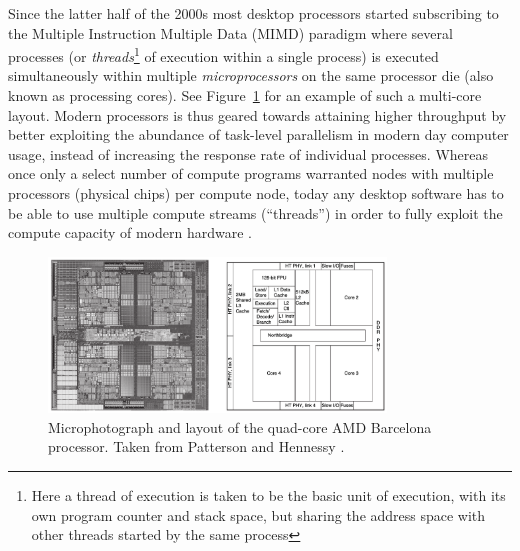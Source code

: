 Since the latter half of the 2000s most desktop processors started subscribing to the Multiple Instruction Multiple Data (MIMD) paradigm where several processes 
(or \textit{threads}\footnote{Here a thread of execution is taken to be the basic unit of execution, with its own program counter and stack space, but sharing the address space with other threads started by the same process} of execution 
within a single process) is executed simultaneously within multiple \textit{microprocessors} on the same processor die (also known as processing cores). 
See Figure~\ref{fig_amd_barcelona_arch} for an example of such a multi-core layout. Modern processors is thus geared towards attaining higher throughput by better exploiting the 
abundance of task-level parallelism in modern day computer usage, instead of increasing the response rate of individual processes. Whereas once only a select number of compute 
programs warranted nodes with multiple processors (physical chips) per compute node, today any desktop software has to be able to use multiple compute streams (``threads'') 
in order to fully exploit the compute capacity of modern hardware \cite{patterson2009computer} \cite{akhter2006multi}. 
\begin{figure}[ht!]
 \begin{mdframed}
  \centering
  \includegraphics[width=0.8\textwidth]{images/amd_barcelona.png}
  \caption[AMD Barcelona]{Microphotograph and layout of the quad-core AMD Barcelona processor. Taken from Patterson and Hennessy \cite[ch. 1]{patterson2009computer}.}
  \label{fig_amd_barcelona_arch}
 \end{mdframed}
\end{figure}

